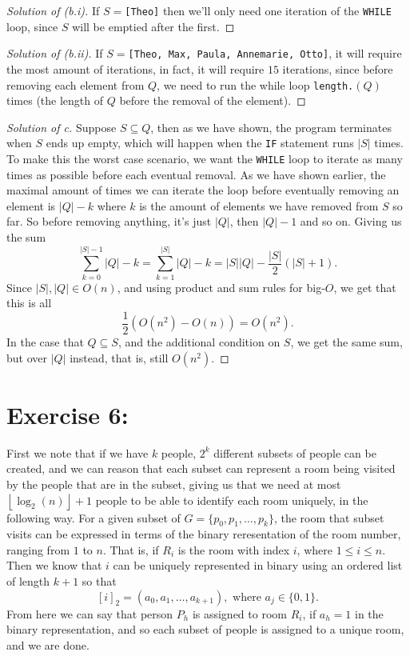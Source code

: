 \documentclass{article}
\begin{document}
\begin{proof}[Solution of (b.i)]
    If $S=$\texttt{[Theo]} then we'll only need one iteration of the \texttt{WHILE} loop, since
    $S$ will be emptied after the first. 
\end{proof}
\begin{proof}[Solution of (b.ii)]
    If $S=$\texttt{[Theo, Max, Paula, Annemarie, Otto]}, it will require the most amount of 
    iterations, in fact, it will require $15$ iterations, since before removing each element from
    $Q$, we need to run the while loop \texttt{length.}$(Q)$ times (the length of $Q$ before the
    removal of the element). 
\end{proof}
\begin{proof}[Solution of c]
Suppose  $S \subseteq Q$, then as we have shown, the program terminates when $S$ ends up empty, 
which will happen when the  \texttt{IF}  statement runs $\left|S\right|$ times. To make this
the worst case scenario, we want the \texttt{WHILE} loop to iterate as many times as possible 
before each eventual removal. As we have shown earlier, the maximal amount of times we can iterate
the loop before eventually removing an element is $\left|Q\right| - k$ where $k$ is the amount 
of elements we have removed from $S$ so far. So before removing anything, it's just  $\left|Q
\right|$, then $\left|Q\right| - 1$ and so on. Giving us the sum \[
\sum\limits_{k=0}^{\left|S\right|- 1} \left|Q\right| - k = \sum\limits_{k=1}^{\left|S\right|} 
\left|Q\right| - k = \left|S\right|\left|Q\right| - \frac{\left|S\right|}{2}
(\left|S\right| + 1).
\] Since $\left|S\right|, \left|Q\right| \in O(n)$, and using product and sum rules for big-$O$, 
we get that this is all \[
\frac{1}{2}(O(n^2) - O(n)) = O(n^2).
\] In the case that $Q \subseteq S$, and the additional condition on $S$, we get the same sum, but
over $\left|Q\right|$ instead, that is, still $O(n^2)$. 
\end{proof}

\section*{Exercise 6:}
First we note that if we have $k$ people, $2^{k}$ different subsets of people can be created, 
and we can reason that each subset can represent a room being visited by the people that are in the
subset, giving us that we need at most $\left\lfloor \log_{2}(n) \right\rfloor + 1$ people
to be able to identify each room uniquely, in the following way. 
For a given subset of $G= \{p_0,p_1,\ldots,p_{k}\}$, the room that subset visits can be expressed 
in terms of the binary reresentation of the room number, ranging from  $1$ to $n$. That is, if
$R_{i}$ is the room with index $i$, where  $1\leq i \leq n$. Then we know that $i$ can be
uniquely represented in binary using an ordered list of length $k+1$ so that \[
    [i]_{2} = (a_0, a_1,\ldots, a_{k+1}), \text{ where } a_{j} \in \{0,1\} .
\] From here we can say that person  $P_{h}$ is assigned to room $R_{i}$, if $a_{h} = 1$ in the 
binary representation, and so each subset of people is assigned to a unique room, and we are done.
\end{document}
